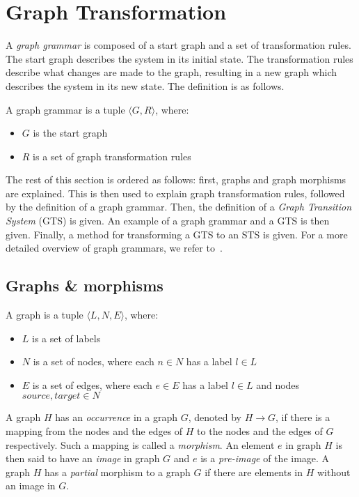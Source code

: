 \section{Graph Transformation}\label{sec:graph}
A \textit{graph grammar} is composed of a start graph and a set of transformation rules. The start graph describes the system in its initial state. The transformation rules describe what changes are made to the graph, resulting in a new graph which describes the system in its new state. The definition is as follows.

\begin{definition}
A graph grammar is a tuple $\langle G, R\rangle$, where:
\begin{itemize}
  \item $G$ is the start graph
  \item $R$ is a set of graph transformation rules
\end{itemize}
\end{definition} 

The rest of this section is ordered as follows: first, graphs and graph morphisms are explained. This is then used to explain graph transformation rules, followed by the definition of a graph grammar. Then, the definition of a \textit{Graph Transition System} (GTS) is given. An example of a graph grammar and a GTS is then given. Finally, a method for transforming a GTS to an STS is given. For a more detailed overview of graph grammars, we refer to~\cite{Rensink:graph_grammars, Heckel2006187, Andries1999}.

\subsection{Graphs \& morphisms}
\begin{definition}
A graph is a tuple $\langle L, N, E\rangle$, where:
\begin{itemize}
  \item $L$ is a set of labels
  \item $N$ is a set of nodes, where each $n \in N$ has a label $l \in L$
  \item $E$ is a set of edges, where each $e \in E$ has a label $l \in L$ and nodes $source,target \in N$
\end{itemize}
\end{definition}

A graph $H$ has an \textit{occurrence} in a graph $G$, denoted by $H \rightarrow G$, if there is a mapping from the nodes and the edges of $H$ to the nodes and the edges of $G$ respectively. Such a mapping is called a \textit{morphism}. An element $e$ in graph $H$ is then said to have an \textit{image} in graph $G$ and $e$ is a \textit{pre-image} of the image. A graph $H$ has a \textit{partial} morphism to a graph $G$ if there are elements in $H$ without an image in $G$.

